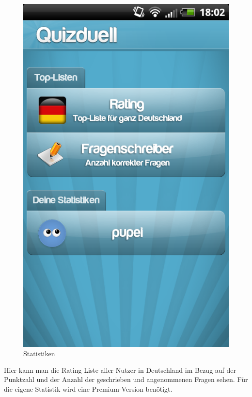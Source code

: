 \documentclass[fontsize=12pt,paper=a4,twoside]{scrartcl}
\begin{document}
\begin{figure}[H]
\centering
\includegraphics[scale=0.5]{Bilder/stat.png}
\caption{Statistiken}
\end{figure}

Hier kann man die Rating Liste aller Nutzer in Deutschland im Bezug auf der Punktzahl und der Anzahl der geschrieben und angenommenen Fragen sehen. Für die eigene Statistik wird eine Premium-Version benötigt.\\
\end{document}
